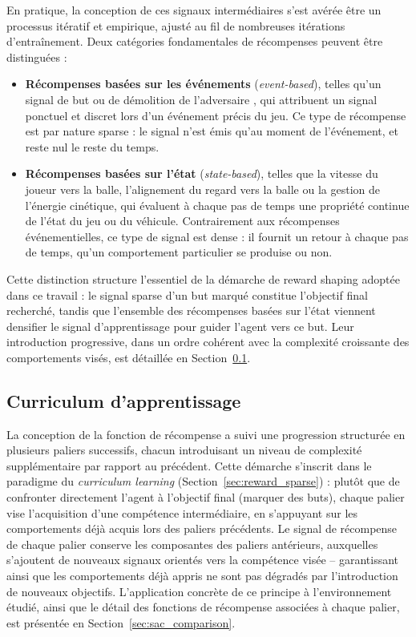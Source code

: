 En pratique, la conception de ces signaux intermédiaires s'est avérée être un processus itératif et empirique, ajusté au fil de nombreuses itérations d'entraînement. Deux catégories fondamentales de récompenses peuvent être distinguées :

\begin{itemize}
    \item \textbf{Récompenses basées sur les événements} (\textit{event-based}), telles qu'un signal de but ou de démolition de l'adversaire , qui attribuent un signal ponctuel et discret lors d'un événement précis du jeu. Ce type de récompense est par nature sparse : le signal n'est émis qu'au moment de l'événement, et reste nul le reste du temps.
    \item \textbf{Récompenses basées sur l'état} (\textit{state-based}), telles que la vitesse du joueur vers la balle, l'alignement du regard vers la balle ou la gestion de l'énergie cinétique, qui évaluent à chaque pas de temps une propriété continue de l'état du jeu ou du véhicule. Contrairement aux récompenses événementielles, ce type de signal est dense : il fournit un retour à chaque pas de temps, qu'un comportement particulier se produise ou non.
\end{itemize}

Cette distinction structure l'essentiel de la démarche de reward shaping adoptée dans ce travail : le signal sparse d'un but marqué constitue l'objectif final recherché, tandis que l'ensemble des récompenses basées sur l'état viennent densifier le signal d'apprentissage pour guider l'agent vers ce but. Leur introduction progressive, dans un ordre cohérent avec la complexité croissante des comportements visés, est détaillée en Section~\ref{sec:curriculum}.

\subsection{Curriculum d'apprentissage}
\label{sec:curriculum}

La conception de la fonction de récompense a suivi une progression structurée en plusieurs paliers successifs, chacun introduisant un niveau de complexité supplémentaire par rapport au précédent. Cette démarche s'inscrit dans le paradigme du \textit{curriculum learning} (Section~\ref{sec:reward_sparse}) : plutôt que de confronter directement l'agent à l'objectif final (marquer des buts), chaque palier vise l'acquisition d'une compétence intermédiaire, en s'appuyant sur les comportements déjà acquis lors des paliers précédents. Le signal de récompense de chaque palier conserve les composantes des paliers antérieurs, auxquelles s'ajoutent de nouveaux signaux orientés vers la compétence visée -- garantissant ainsi que les comportements déjà appris ne sont pas dégradés par l'introduction de nouveaux objectifs. L'application concrète de ce principe à l'environnement étudié, ainsi que le détail des fonctions de récompense associées à chaque palier, est présentée en Section~\ref{sec:sac_comparison}.

